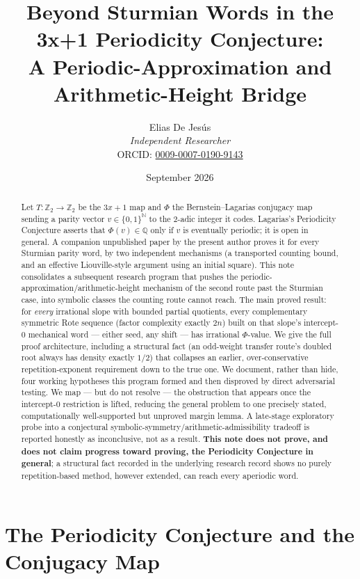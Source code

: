 \documentclass[11pt]{article}
\title{Beyond Sturmian Words in the 3x+1 Periodicity Conjecture:\\
A Periodic-Approximation and Arithmetic-Height Bridge}
\author{Elias De Jesús\\
\textit{Independent Researcher}\\
ORCID: \href{https://orcid.org/0009-0007-0190-9143}{0009-0007-0190-9143}}
\date{September 2026}
\newcommand{\Q}{\mathbb{Q}}
\newcommand{\Z}{\mathbb{Z}}
\newcommand{\N}{\mathbb{N}}
\begin{document}
\sloppy
\maketitle

\begin{abstract}
Let $T:\Z_2\to\Z_2$ be the $3x+1$ map and $\Phi$ the Bernstein--Lagarias conjugacy map sending a parity vector $v\in\{0,1\}^\N$ to the 2-adic integer it codes. Lagarias's Periodicity Conjecture asserts that $\Phi(v)\in\Q$ only if $v$ is eventually periodic; it is open in general. A companion unpublished paper by the present author proves it for every Sturmian parity word, by two independent mechanisms (a transported counting bound, and an effective Liouville-style argument using an initial square). This note consolidates a subsequent research program that pushes the periodic-approximation/arithmetic-height mechanism of the second route past the Sturmian case, into symbolic classes the counting route cannot reach. The main proved result: for \emph{every} irrational slope with bounded partial quotients, every complementary symmetric Rote sequence (factor complexity exactly $2n$) built on that slope's intercept-$0$ mechanical word --- either seed, any shift --- has irrational $\Phi$-value. We give the full proof architecture, including a structural fact (an odd-weight transfer route's doubled root always has density exactly $1/2$) that collapses an earlier, over-conservative repetition-exponent requirement down to the true one. We document, rather than hide, four working hypotheses this program formed and then disproved by direct adversarial testing. We map --- but do not resolve --- the obstruction that appears once the intercept-$0$ restriction is lifted, reducing the general problem to one precisely stated, computationally well-supported but unproved margin lemma. A late-stage exploratory probe into a conjectural symbolic-symmetry/arithmetic-admissibility tradeoff is reported honestly as inconclusive, not as a result. \textbf{This note does not prove, and does not claim progress toward proving, the Periodicity Conjecture in general}; a structural fact recorded in the underlying research record shows no purely repetition-based method, however extended, can reach every aperiodic word.
\end{abstract}

\tableofcontents

\section{The Periodicity Conjecture and the Conjugacy Map}
\label{sec:conjecture}
\end{document}
